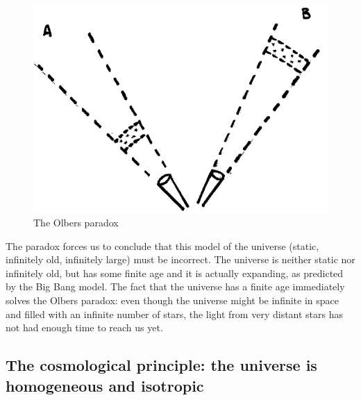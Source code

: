 \begin{figure}[ht]
\begin{center}
\includegraphics[scale=0.5]{Draw/lec4_3.png}
\end{center}
\caption{The Olbers paradox}
\label{fig:lec4_3}
\end{figure}

The paradox forces us to conclude that this model of the universe (static, infinitely old, infinitely large) must be incorrect. The universe is neither static nor infinitely old, but has some finite age and it is actually expanding, as predicted by the Big Bang model. The fact that the universe has a finite age immediately solves the Olbers paradox: even though the universe might be infinite in space and filled with an infinite number of stars, the light from very distant stars has not had enough time to reach us yet.

\subsection{The cosmological principle: the universe is homogeneous and isotropic}

